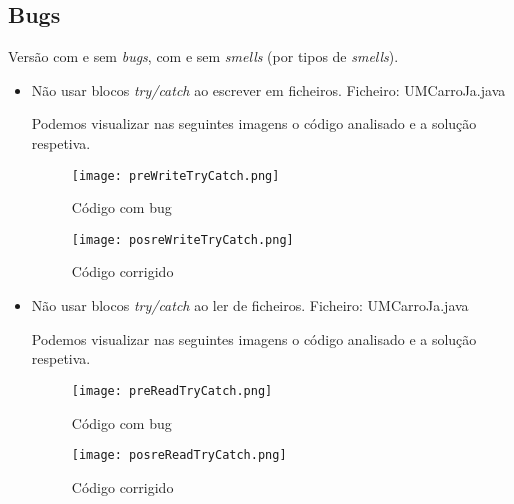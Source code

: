 \subsection{Bugs}
Versão com e sem \textit{bugs}, com e sem \textit{smells} (por tipos de \textit{smells}).
\begin{itemize}
\item Não usar blocos \textit{try/catch} ao escrever em ficheiros.\newline
 Ficheiro: UMCarroJa.java\newline


\par Podemos visualizar nas seguintes imagens o código analisado e a solução respetiva.

\begin{figure}[H]

  \centering

  \texttt{[image: preWriteTryCatch.png]}

  \caption {Código com bug}

  \label {fig02}

\end{figure}

\begin{figure}[H]

  \centering

  \texttt{[image: posreWriteTryCatch.png]}

  \caption {Código corrigido}

  \label {fig03}

\end{figure}

\item Não usar blocos \textit{try/catch} ao ler de ficheiros.\newline
 Ficheiro: UMCarroJa.java\newline


\par Podemos visualizar nas seguintes imagens o código analisado e a solução respetiva.


\begin{figure}[H]

  \centering

  \texttt{[image: preReadTryCatch.png]}

  \caption {Código com bug}

  \label {fig04}

\end{figure}

\begin{figure}[H]

  \centering

  \texttt{[image: posreReadTryCatch.png]}

  \caption {Código corrigido}

  \label {fig05}

\end{figure}

\end{itemize}

